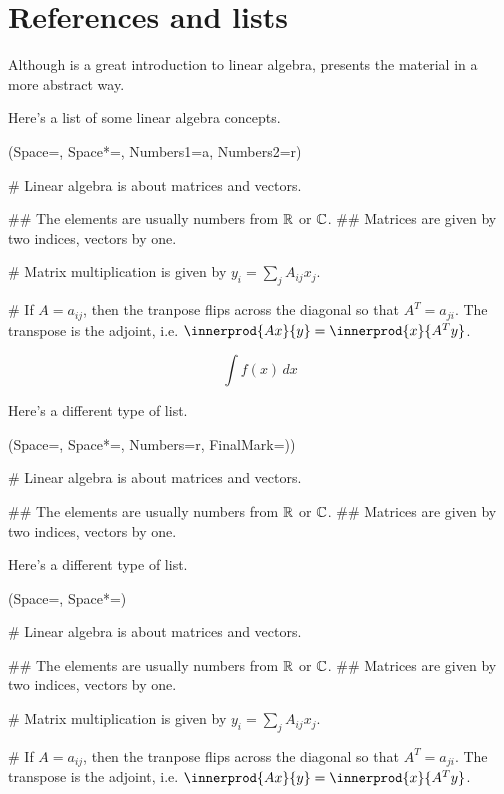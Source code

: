 \label{chapter:some_more_latex}

\section{References and lists}

Although \cite{strang_linear_1976} is a great introduction to linear algebra, \cite{roman_advanced_2005} presents the material in a more abstract way.

Here's a list of some linear algebra concepts.
\begin{easylist}[enumerate]
	\ListProperties(Space=\listSpace, Space*=\listSpace, Numbers1=a, Numbers2=r)
	
	# Linear algebra is about matrices and vectors.
	
	## The elements are usually numbers from $\operatorname{\mathbb{R}}$ or $\operatorname{\mathbb{C}}$.
	## Matrices are given by two indices, vectors by one.
	
	# Matrix multiplication is given by $y_i = \sum_j A_{ij} x_j$.
	
	# If $A = a_{ij}$, then the tranpose flips across the diagonal so that $A^T = a_{ji}$.
	The transpose is the adjoint, i.e. $\innerprod{Ax}{y} = \innerprod{x}{A^Ty}$.
\end{easylist}


$$\int f(x) \, dx$$


Here's a different type of list.

\begin{easylist}[enumerate]
	\ListProperties(Space=\listSpace, Space*=\listSpace, Numbers=r, FinalMark={)})
	
	# Linear algebra is about matrices and vectors.
	
	## The elements are usually numbers from $\operatorname{\mathbb{R}}$ or $\operatorname{\mathbb{C}}$.
	## Matrices are given by two indices, vectors by one.

\end{easylist}

Here's a different type of list.

\begin{easylist}[itemize]
	\ListProperties(Space=\listSpace, Space*=\listSpace)
	
	# Linear algebra is about matrices and vectors.
	
	## The elements are usually numbers from $\operatorname{\mathbb{R}}$ or $\operatorname{\mathbb{C}}$.
	## Matrices are given by two indices, vectors by one.
	
	# Matrix multiplication is given by $y_i = \sum_j A_{ij} x_j$.
	
	# If $A = a_{ij}$, then the tranpose flips across the diagonal so that $A^T = a_{ji}$.
	The transpose is the adjoint, i.e. $\innerprod{Ax}{y} = \innerprod{x}{A^Ty}$.
\end{easylist}


